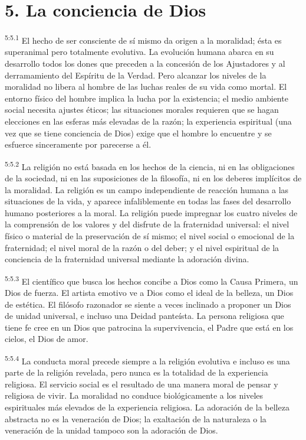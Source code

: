 \section*{5. La conciencia de Dios}
\par
\textsuperscript{5:5.1} El hecho de ser consciente de sí mismo da origen a la moralidad; ésta es superanimal pero totalmente evolutiva. La evolución humana abarca en su desarrollo todos los dones que preceden a la concesión de los Ajustadores y al derramamiento del Espíritu de la Verdad. Pero alcanzar los niveles de la moralidad no libera al hombre de las luchas reales de su vida como mortal. El entorno físico del hombre implica la lucha por la existencia; el medio ambiente social necesita ajustes éticos; las situaciones morales requieren que se hagan elecciones en las esferas más elevadas de la razón; la experiencia espiritual (una vez que se tiene conciencia de Dios) exige que el hombre lo encuentre y se esfuerce sinceramente por parecerse a él.

\par
\textsuperscript{5:5.2} La religión no está basada en los hechos de la ciencia, ni en las obligaciones de la sociedad, ni en las suposiciones de la filosofía, ni en los deberes implícitos de la moralidad. La religión es un campo independiente de reacción humana a las situaciones de la vida, y aparece infaliblemente en todas las fases del desarrollo humano posteriores a la moral. La religión puede impregnar los cuatro niveles de la comprensión de los valores y del disfrute de la fraternidad universal: el nivel físico o material de la preservación de sí mismo; el nivel social o emocional de la fraternidad; el nivel moral de la razón o del deber; y el nivel espiritual de la conciencia de la fraternidad universal mediante la adoración divina.

\par
\textsuperscript{5:5.3} El científico que busca los hechos concibe a Dios como la Causa Primera, un Dios de fuerza. El artista emotivo ve a Dios como el ideal de la belleza, un Dios de estética. El filósofo razonador se siente a veces inclinado a proponer un Dios de unidad universal, e incluso una Deidad panteísta. La persona religiosa que tiene fe cree en un Dios que patrocina la supervivencia, el Padre que está en los cielos, el Dios de amor.

\par
\textsuperscript{5:5.4} La conducta moral precede siempre a la religión evolutiva e incluso es una parte de la religión revelada, pero nunca es la totalidad de la experiencia religiosa. El servicio social es el resultado de una manera moral de pensar y religiosa de vivir. La moralidad no conduce biológicamente a los niveles espirituales más elevados de la experiencia religiosa. La adoración de la belleza abstracta no es la veneración de Dios; la exaltación de la naturaleza o la veneración de la unidad tampoco son la adoración de Dios.

